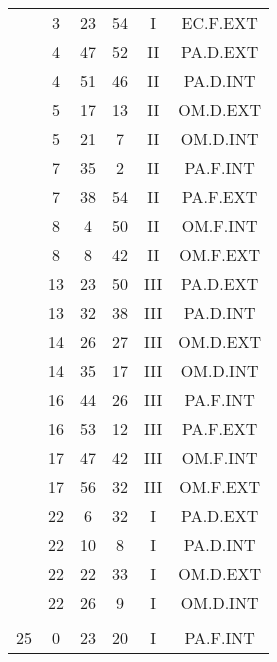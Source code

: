\documentclass[12pt, a4paper]{article}
\begin{document}
\begin{multicols}{3}
{\begin{tabular}{c c c c c c}
	 	 	 	 & 3 & 23 & 54 & I & EC.F.EXT\\%
	 	 	 	 & 4 & 47 & 52 & II & PA.D.EXT\\%
	 	 	 	 & 4 & 51 & 46 & II & PA.D.INT\\%
	 	 	 	 & 5 & 17 & 13 & II & OM.D.EXT\\%
	 	 	 	 & 5 & 21 & 7 & II & OM.D.INT\\%
	 	 	 	 & 7 & 35 & 2 & II & PA.F.INT\\%
	 	 	 	 & 7 & 38 & 54 & II & PA.F.EXT\\%
	 	 	 	 & 8 & 4 & 50 & II & OM.F.INT\\%
	 	 	 	 & 8 & 8 & 42 & II & OM.F.EXT\\%
	 	 	 	 & 13 & 23 & 50 & III & PA.D.EXT\\%
	 	 	 	 & 13 & 32 & 38 & III & PA.D.INT\\%
	 	 	 	 & 14 & 26 & 27 & III & OM.D.EXT\\%
	 	 	 	 & 14 & 35 & 17 & III & OM.D.INT\\%
	 	 	 	 & 16 & 44 & 26 & III & PA.F.INT\\%
	 	 	 	 & 16 & 53 & 12 & III & PA.F.EXT\\%
	 	 	 	 & 17 & 47 & 42 & III & OM.F.INT\\%
	 	 	 	 & 17 & 56 & 32 & III & OM.F.EXT\\%
	 	 	 	 & 22 & 6 & 32 & I & PA.D.EXT\\%
	 	 	 	 & 22 & 10 & 8 & I & PA.D.INT\\%
	 	 	 	 & 22 & 22 & 33 & I & OM.D.EXT\\%
	 	 	 	 & 22 & 26 & 9 & I & OM.D.INT\\%
	 	 	 	 & & & & & \\%
	 	 	 	25 & 0 & 23 & 20 & I & PA.F.INT\\%

\end{tabular}}
\end{multicols}
\end{document}
